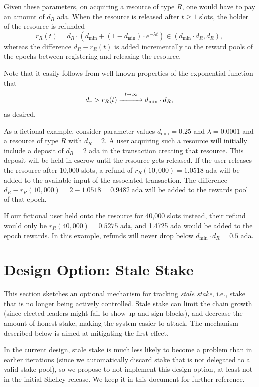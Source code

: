 \documentclass[11pt,a4paper,dvipsnames,twosided]{article}
\begin{document}
Given these parameters, on acquiring a resource of type $R$, one would have to
pay an amount of $d_R$ ada\@. When the resource is released after $t\geq 1$ slots,
the holder of the resource is refunded
\[
    r_R(t)=d_R\cdot\left(d_{\min}+(1-d_{\min})\cdot e^{-\lambda t}\right)\in(d_{\min}\cdot d_R,d_R),
\]
whereas the difference $d_R-r_R(t)$ is added incrementally to the reward pools of
the epochs between registering and releasing the resource.

Note that it easily follows from well-known properties of the exponential
function that
\[
    d_r>r_R(t)\stackrel{t\rightarrow\infty}{\xrightarrow{\hspace{10mm}}}d_{\min}\cdot d_R,
\]
as desired.

As a fictional example, consider parameter values $d_{\min}=0.25$ and $\lambda=0.0001$
and a resource of type $R$ with $d_R=2$. A user acquiring such a resource
will initially include a deposit of $d_R=2$ ada in the transaction creating that
resource. This deposit will be held in escrow until the resource gets released.
If the user releases the resource after 10,000 slots, a refund of
$r_R(10,000)=1.0518$ ada will be added to the available input of the associated
transaction. The difference $d_R-r_R(10,000)=2-1.0518=0.9482$ ada will be added
to the rewards pool of that epoch.

If our fictional user held onto the resource for 40,000 slots instead,
their refund would only be $r_R(40,000)=0.5275$ ada, and 1.4725 ada
would be added to the epoch rewards. In this example, refunds will
never drop below $d_{\min}\cdot d_R=0.5$ ada.

\section{Design Option: Stale Stake}
\label{stale-stake}

This section sketches an optional mechanism for tracking \emph{stale
  stake}, i.e., stake that is no longer being actively
controlled. Stale stake can limit the chain growth (since elected
leaders might fail to show up and sign blocks), and decrease the
amount of honest stake, making the system easier to attack. The
mechanism described below is aimed at mitigating the first effect.

In the current design, stale stake is much less likely to become a
problem than in earlier iterations (since we automatically discard
stake that is not delegated to a valid stake pool), so we propose to
not implement this design option, at least not in the initial Shelley
release. We keep it in this document for further reference.
\end{document}
